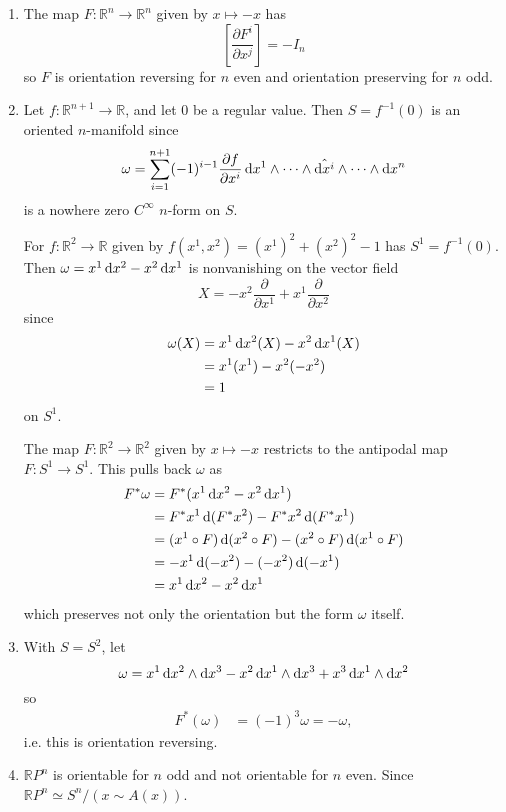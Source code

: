 \begin{xmpl}
  \begin{enumerate}
    \item{
      The map $F: \mathbb{R}^n \to \mathbb{R}^n$ given by
      $x \mapsto -x$ has
      $$
        \left[
          \frac{\partial F^i}{\partial x^j}
        \right]
      = -I_n
      $$
      so $F$ is orientation reversing for $n$ even and orientation
      preserving for $n$ odd.
    }
    \item{
      Let $f: \mathbb{R}^{n+1} \to \mathbb{R}$, and let 0 be a regular
      value. Then $S = f^{-1}(0)$ is an oriented $n$-manifold since
      $$
        \omega
      = \sum_{i=1}^{n+1}
          (-1)^{i-1}
          \frac{\partial f}{\partial x^i}
          \mathop{}\!\mathrm{d} x^1
          \wedge \cdots
          \wedge \hat{\mathop{}\!\mathrm{d} x^i}
          \wedge \cdots
          \wedge \mathop{}\!\mathrm{d} x^n
      $$
      is a nowhere zero $C^\infty$ $n$-form on $S$.

      For $f: \mathbb{R}^2 \to \mathbb{R}$ given by
      $f(x^1, x^2) = (x^1)^2 + (x^2)^2 - 1$ has
      $S^1 = f^{-1}(0)$. Then
      $\omega = x^1 \mathop{}\!\mathrm{d} x^2 - x^2 \mathop{}\!\mathrm{d} x^1$ is nonvanishing on the
      vector field
      $$
        X
      = - x^2 \frac{\partial}{\partial x^1}
        + x^1 \frac{\partial}{\partial x^2}
      $$
      since
      \begin{align*}
         \omega(X)
      &= x^1 \mathop{}\!\mathrm{d} x^2(X) - x^2 \mathop{}\!\mathrm{d} x^1(X) \\
      &= x^1(x^1) - x^2 (-x^2) \\
      &= 1
      \end{align*}
      on $S^1$.

      The map $F: \mathbb{R}^2 \to \mathbb{R}^2$
      given by $x \mapsto -x$ restricts to the
      antipodal map $F: S^1 \to S^1$. This pulls back $\omega$ as
      \begin{align*}
         F^\ast \omega
      &= F^\ast(x^1 \dif x^2 - x^2 \dif x^1) \\
      &= F^\ast x^1 \dif (F^\ast x^2)
       - F^\ast x^2 \dif (F^\ast x^1) \\
      &= (x^1 \circ F) \dif (x^2 \circ F)
       - (x^2 \circ F) \dif (x^1 \circ F) \\
      &= -x^1 \dif (-x^2) - (-x^2) \dif (-x^1) \\
      &= x^1 \dif x^2 - x^2 \dif x^1
      \end{align*}
      which preserves not only the orientation but the form $\omega$ itself.
    }
    \item{
      With $S = S^2$, let
      $$
        \omega
      = x^1 \mathop{}\!\mathrm{d} x^2 \wedge \mathop{}\!\mathrm{d} x^3
      - x^2 \mathop{}\!\mathrm{d} x^1 \wedge \mathop{}\!\mathrm{d} x^3
      + x^3 \mathop{}\!\mathrm{d} x^1 \wedge \mathop{}\!\mathrm{d} x^2
      $$
      so
      \begin{align*}
         F^\ast(\omega)
      &= (-1)^3 \omega = -\omega,
      \end{align*}
      i.e. this is orientation reversing.
    }
    \item{
      $\mathbb{R} P^n$ is orientable for $n$ odd and not orientable
      for $n$ even.
      Since $\mathbb{R} P^n \simeq S^n / (x \sim A(x))$.
    }
  \end{enumerate}
\end{xmpl}

